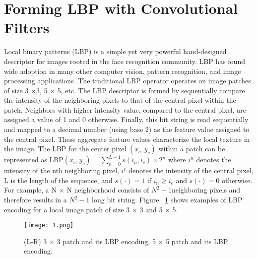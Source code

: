 \documentclass[10pt,twocolumn,a4paper]{article}
\begin{document}
\section{Forming LBP with Convolutional Filters}
Local binary patterns (LBP) is a simple yet very powerful hand-designed descriptor for images rooted in the face recognition community. LBP has found wide adoption in many other computer vision, pattern recognition, and image processing applications \cite{pietikainen2011computer}.The traditional LBP operator  operates on image patches of size 3 $\times $3, 5 $\times $ 5, etc. The LBP descriptor is formed by sequentially compare the intensity of the neighboring pixels to that of the central pixel within the patch. Neighbors with higher intensity value, compared to the central pixel, are assigned a value of 1 and 0 otherwise. Finally, this bit string is read sequentially and mapped to a decimal number (using base 2) as the feature value assigned to the central pixel. These aggregate feature values characterize the local texture in the image. The LBP for the center pixel $\left( x_c,y_c\right)$ within a patch can be represented as LBP$\left( x_c,y_c\right)=\sum_{n=0}^{L-1}s\left( i_n,i_c\right) \times 2^n$ where $i^n$ denotes the intensity of the nth neighboring pixel, $i^c$ denotes the intensity of the central pixel, L is the length of the sequence, and $s\left(\cdot\right)=1$ if $i_n\geqslant i_c$ and $s\left(\cdot\right)=0$ otherwise. For example, a N $\times$ N neighborhood consists of $N^2-1$neighboring pixels and therefore results in a $N^2-1$ long bit string. Figure ~\ref{fig1} shows examples of LBP encoding for a local image patch of size 3 $\times$ 3 and 5 $\times$ 5.

\begin{figure}
  \centering
  \texttt{[image: 1.png]}\\
  \caption{ (L-R) 3 $\times$ 3 patch and its LBP encoding, 5 $\times$ 5 patch and its LBP encoding.
}\label{fig1}
\end{figure}

  {\small


}
\end{document}
